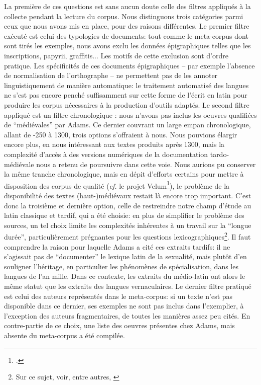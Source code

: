 La première de ces questions est sans aucun doute celle des filtres appliqués à la collecte pendant la lecture du corpus. Nous distinguons trois catégories parmi ceux que nous avons mis en place, pour des raisons différentes. Le premier filtre exécuté est celui des typologies de documents: tout comme le meta-corpus dont sont tirés les exemples, nous avons exclu les données épigraphiques telles que les inscriptions, papyrii, graffitis... Les motifs de cette exclusion sont d'ordre pratique. Les spécificités de ces documents épigraphiques -- par exemple l'absence de normalisation de l'orthographe -- ne permettent pas de les annoter linguistiquement de manière automatique: le traitement automatisé des langues ne s'est pas encore penché suffisamment sur cette forme de l'écrit en latin pour produire les corpus nécessaires à la production d'outils adaptés. Le second filtre appliqué est un filtre chronologique : nous n’avons pas inclus les oeuvres qualifiées de \enquote{médiévales} par Adams. Ce dernier couvrant un large empan chronologique, allant de -250 à 1300, trois options s'offraient à nous. Nous pouvions élargir encore plus, en nous intéressant aux textes produits après 1300, mais la complexité d'accès à des versions numériques de la documentation tardo-médiévale nous a retenu de poursuivre dans cette voie. Nous aurions pu conserver la même tranche chronologique, mais en dépit d'efforts certains pour mettre à disposition des corpus de qualité (\textit{cf.} le projet Velum\footcite{bon2019challenges}), le problème de la disponibilité des textes (haut-)médiévaux restait là encore trop important. C'est donc la troisième et dernière option, celle de restreindre notre champ d'étude au latin classique et tardif, qui a été choisie: en plus de simplifier le problème des sources, un tel choix limite les complexités inhérentes à un travail sur la \enquote{longue durée}, particulièrement prégnantes pour les questions lexicographiques\footnote{Sur ce sujet, voir, entre autres, \textcite{gabay_lacteur_2015}}. Il faut comprendre la raison pour laquelle Adams a cité ces extraits tardifs: il ne s'agissait pas de \enquote{documenter} le lexique latin de la sexualité, mais plutôt d'en souligner l'héritage, en particulier les phénomènes de spécialisation, dans les langues de l'an mille. Dans ce contexte, les extraits du médio-latin ont alors le même statut que les extraits des langues vernaculaires. Le dernier filtre pratiqué est celui des auteurs représentés dans le meta-corpus: si un texte n'est pas disponible dans ce dernier, ses exemples ne sont pas inclus dans l'exemplier, à l'exception des auteurs fragmentaires,  de toutes les manières assez peu cités. En contre-partie de ce choix, une liste des oeuvres présentes chez Adams, mais absente du meta-corpus a été compilée.

